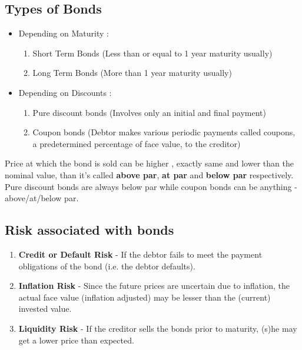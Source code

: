 \subsection{Types of Bonds}
\begin{itemize}
    \item Depending on Maturity :
    \begin{enumerate}
        \item Short Term Bonds (Less than or equal to 1 year maturity usually)
        \item Long Term Bonds (More than 1 year maturity usually)
    \end{enumerate}
    \item Depending on Discounts :
    \begin{enumerate}
        \item Pure discount bonds (Involves only an initial and final payment)
        \item Coupon bonds (Debtor makes various periodic payments called coupons, a predetermined percentage of face value, to the creditor)
    \end{enumerate}
\end{itemize}

Price at which the bond is sold can be higher , exactly same and lower than the nominal value, than it's called \textbf{above par}, \textbf{at par} and \textbf{below par} respectively. Pure discount bonds are always below par while coupon bonds can be anything - above/at/below par.
\subsection{Risk associated with bonds}
\begin{enumerate}
    \item \textbf{Credit or Default Risk} - If the debtor fails to meet the payment obligations of the bond (i.e. the debtor defaults).
    \item \textbf{Inflation Risk} - Since the future prices are uncertain due to inflation, the actual face value (inflation adjusted) may be lesser than the (current) invested value.
    \item \textbf{Liquidity Risk} - If the creditor sells the bonds prior to maturity, (s)he may get a lower price than expected.
\end{enumerate}


